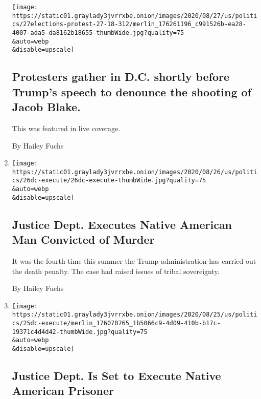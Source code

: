 \begin{enumerate}
  \texttt{[image: https://static01.graylady3jvrrxbe.onion/images/2020/08/27/us/politics/27elections-protest-27-18-312/merlin\_176261196\_c991526b-ea28-4007-ada5-da8162b18655-thumbWide.jpg?quality=75\\\&auto=webp\\\&disable=upscale]}

  \hypertarget{protesters-gather-in-dc-shortly-before-trumps-speech-to-denounce-the-shooting-of-jacob-blake}{%
  \subsection{Protesters gather in D.C. shortly before Trump's speech to
  denounce the shooting of Jacob
  Blake.}\label{protesters-gather-in-dc-shortly-before-trumps-speech-to-denounce-the-shooting-of-jacob-blake}}

  This was featured in live coverage.

  By Hailey Fuchs
\item
  \href{/2020/08/26/us/politics/lezmond-mitchell-executed.html}{}

  \texttt{[image: https://static01.graylady3jvrrxbe.onion/images/2020/08/26/us/politics/26dc-execute/26dc-execute-thumbWide.jpg?quality=75\\\&auto=webp\\\&disable=upscale]}

  \hypertarget{justice-dept-executes-native-american-man-convicted-of-murder}{%
  \subsection{Justice Dept. Executes Native American Man Convicted of
  Murder}\label{justice-dept-executes-native-american-man-convicted-of-murder}}

  It was the fourth time this summer the Trump administration has
  carried out the death penalty. The case had raised issues of tribal
  sovereignty.

  By Hailey Fuchs
\item
  \href{/2020/08/25/us/politics/native-american-death-penalty.html}{}

  \texttt{[image: https://static01.graylady3jvrrxbe.onion/images/2020/08/25/us/politics/25dc-execute/merlin\_176070765\_1b5066c9-4d09-410b-b17c-19371c4d4d42-thumbWide.jpg?quality=75\\\&auto=webp\\\&disable=upscale]}

  \hypertarget{justice-dept-is-set-to-execute-native-american-prisoner}{%
  \subsection{Justice Dept. Is Set to Execute Native American
  Prisoner}\label{justice-dept-is-set-to-execute-native-american-prisoner}}


\end{enumerate}
